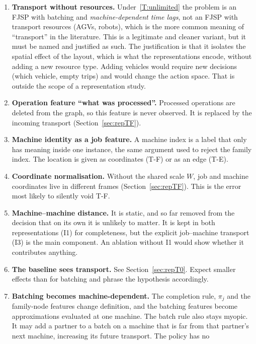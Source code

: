 \documentclass[11pt,a4paper]{article}
\begin{document}
\begin{enumerate}
  \item \textbf{Transport without resources.} Under~\ref{T:unlimited} the problem
    is an FJSP with batching and \emph{machine-dependent time lags}, not an FJSP
    with transport resources (AGVs, robots), which is the more common meaning of
    ``transport'' in the literature. This is a legitimate and cleaner variant,
    but it must be named and justified as such. The justification is that it
    isolates the spatial effect of the layout, which is what the
    representations encode, without adding a new resource type. Adding vehicles
    would require new decisions (which vehicle, empty trips) and would change
    the action space. That is outside the scope of a representation study.
  \item \textbf{Operation feature ``what was processed''.} Processed operations
    are deleted from the graph, so this feature is never observed. It is
    replaced by the incoming transport (Section~\ref{sec:repTF}).
  \item \textbf{Machine identity as a job feature.} A machine index is a label
    that only has meaning inside one instance, the same argument used to reject
    the family index. The location is given as coordinates (T-F) or as an edge
    (T-E).
  \item \textbf{Coordinate normalisation.} Without the shared scale $W$, job and
    machine coordinates live in different frames (Section~\ref{sec:repTF}). This
    is the error most likely to silently void T-F.
  \item \textbf{Machine--machine distance.} It is static, and so far removed
    from the decision that on its own it is unlikely to matter. It is kept in
    both representations (I1) for completeness, but the explicit job--machine
    transport (I3) is the main component. An ablation without I1 would show
    whether it contributes anything.
  \item \textbf{The baseline sees transport.} See Section~\ref{sec:repT0}.
    Expect smaller effects than for batching and phrase the hypothesis
    accordingly.
  \item \textbf{Batching becomes machine-dependent.} The completion rule, $\pi_j$
    and the family-node features change definition, and the batching features
    become approximations evaluated at one machine. The batch rule also stays
    myopic. It may add a partner to a batch on a machine that is far from that
    partner's next machine, increasing its future transport. The policy has no

\end{enumerate}
\end{document}
